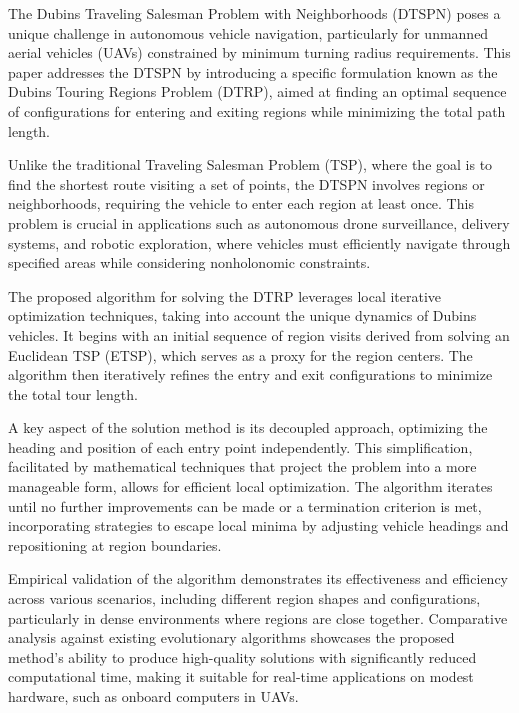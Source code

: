 The Dubins Traveling Salesman Problem with Neighborhoods (DTSPN) poses a unique challenge in autonomous vehicle navigation, particularly for unmanned aerial vehicles (UAVs) constrained by minimum turning radius requirements. This paper addresses the DTSPN by introducing a specific formulation known as the Dubins Touring Regions Problem (DTRP), aimed at finding an optimal sequence of configurations for entering and exiting regions while minimizing the total path length.

\vspace*{6mm}

Unlike the traditional Traveling Salesman Problem (TSP), where the goal is to find the shortest route visiting a set of points, the DTSPN involves regions or neighborhoods, requiring the vehicle to enter each region at least once. This problem is crucial in applications such as autonomous drone surveillance, delivery systems, and robotic exploration, where vehicles must efficiently navigate through specified areas while considering nonholonomic constraints.

\vspace*{6mm}

The proposed algorithm for solving the DTRP leverages local iterative optimization techniques, taking into account the unique dynamics of Dubins vehicles. It begins with an initial sequence of region visits derived from solving an Euclidean TSP (ETSP), which serves as a proxy for the region centers. The algorithm then iteratively refines the entry and exit configurations to minimize the total tour length.

\vspace*{6mm}

A key aspect of the solution method is its decoupled approach, optimizing the heading and position of each entry point independently. This simplification, facilitated by mathematical techniques that project the problem into a more manageable form, allows for efficient local optimization. The algorithm iterates until no further improvements can be made or a termination criterion is met, incorporating strategies to escape local minima by adjusting vehicle headings and repositioning at region boundaries.

\vspace*{6mm}

Empirical validation of the algorithm demonstrates its effectiveness and efficiency across various scenarios, including different region shapes and configurations, particularly in dense environments where regions are close together. Comparative analysis against existing evolutionary algorithms showcases the proposed method's ability to produce high-quality solutions with significantly reduced computational time, making it suitable for real-time applications on modest hardware, such as onboard computers in UAVs.

